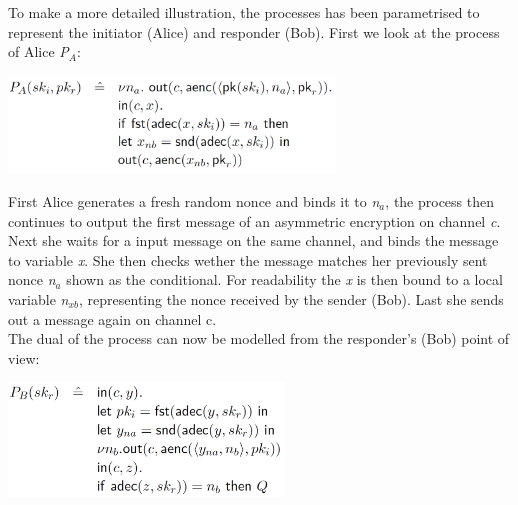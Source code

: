 \noindent To make a more detailed illustration, the processes has been parametrised to represent the initiator (Alice) and responder (Bob). First we look at the process of Alice \textit{P$_A$}:
\begin{center}
\includegraphics[width=0.65\textwidth, angle=0]{Graphics/P_A.pdf}
\end{center}
First Alice generates a fresh random nonce and binds it to \textit{n$_a$}, the process then continues to output the first message of an asymmetric encryption on channel \textit{c}. Next she waits for a input message on the same channel, and binds the message to variable \textit{x}. She then checks wether the message matches her previously sent nonce \textit{n$_a$} shown as the conditional. For readability the \textit{x} is then bound to a local variable \textit{n$_{xb}$}, representing the nonce received by the sender (Bob). Last she sends out a message again on channel c. \\

\noindent The dual of the process can now be modelled from the responder's (Bob) point of view:
\begin{center}
\includegraphics[width=0.55\textwidth, angle=0]{Graphics/P_B.pdf}
\end{center}

